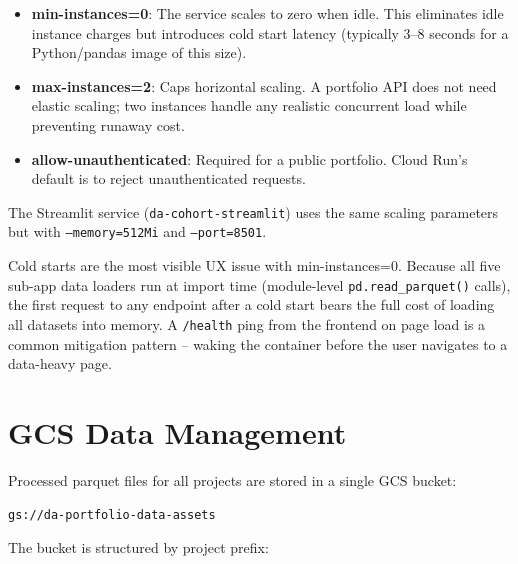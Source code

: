 \begin{itemize}
  \item \textbf{min-instances=0}: The service scales to zero when idle. This eliminates idle instance charges but introduces cold start latency (typically 3--8 seconds for a Python/pandas image of this size).
  \item \textbf{max-instances=2}: Caps horizontal scaling. A portfolio API does not need elastic scaling; two instances handle any realistic concurrent load while preventing runaway cost.
  \item \textbf{allow-unauthenticated}: Required for a public portfolio. Cloud Run's default is to reject unauthenticated requests.
\end{itemize}

The Streamlit service (\texttt{da-cohort-streamlit}) uses the same scaling parameters but with \texttt{--memory=512Mi} and \texttt{--port=8501}.

\begin{keyinsight}
Cold starts are the most visible UX issue with min-instances=0. Because all five sub-app data loaders run at import time (module-level \texttt{pd.read\_parquet()} calls), the first request to any endpoint after a cold start bears the full cost of loading all datasets into memory. A \texttt{/health} ping from the frontend on page load is a common mitigation pattern -- waking the container before the user navigates to a data-heavy page.
\end{keyinsight}

\section{GCS Data Management}
\label{sec:infra-gcs}

Processed parquet files for all projects are stored in a single GCS bucket:

\begin{center}
\texttt{gs://da-portfolio-data-assets}
\end{center}

The bucket is structured by project prefix:

